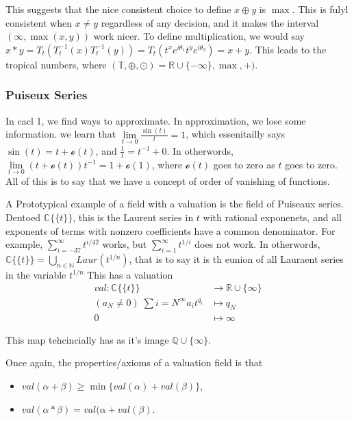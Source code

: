 \documentclass[11pt]{article}
\theoremstyle{definition}
\theoremstyle{plain}%
\theoremstyle{definition}
\def\QQ{{\mathbb Q}}
\def\RR{{\mathbb R}}
\def\CC{{\mathbb C}}
\def\NN{{\mathbb N}}
\begin{document}
This suggests that the nice consistent choice to define $x\oplus y$ is $\max$. This is fulyl consistent when $x \neq y$ regardless of any decision, and it makes the interval $(\infty, \max(x,y))$ work nicer. To define multiplication, we would say $x*y = T_t(T_t^{-1}(x) T_t^{-1}(y))= T_t(t^xe^{i\theta_1}t^ye^{i\theta_2}) = x+y$. This leads to the tropical numbers, where
$(\mathbb{T}, \oplus, \odot) = \RR\cup \{-\infty\}, \max, +)$.







\subsubsection{Puiseux  Series}


In cacl 1, we find ways to approximate. In approximation, we lose some information. we learn that $\lim\limits_{t\rightarrow 0} \frac{\sin(t)}{t} =1$, which essenitailly says $\sin(t) = t+\mathscr{o}(t)$, and $\frac{1}{t} = t^{-1} + 0$. In otherwords, $\lim\limits_{t \rightarrow 0} (t+\mathscr{o}(t))t^{-1} = 1 + \mathscr{o}(1)$, where $ \mathscr{o}(t)$ goes to zero as $t$ goes to zero. All of this is to say that we have a concept of order of vanishing of functions.




A Prototypical example of a field with a valuation is the field of Puiseaux series. Dentoed $\CC\{\{t\}\}$, this is the Laurent series in $t$ with rational exponenets, and all exponents of terms with nonzero coefficients have a common denominator. For example, $\sum\limits_{i=-37}^{\infty} t^{i/42}$ works, but $\sum\limits_{i=1}^\infty t^{1/i}$ does not work. In otherwords, $\CC\{\{t\}\} = \bigcup\limits_{n \in \NN} Laur(t^{1/n})$, that is to say it is th eunion of all Lauraent series in the variable $t^{1/n}$ This has a valuation
\begin{align}
    val: \CC\{\{t\}\} &\rightarrow \RR \cup \{\infty\}
    \\
    (a_N\neq 0)\; \sum\limits{i=N}^\infty a_it^{q_i} &\mapsto q_N
    \\
    0 &\mapsto \infty
\end{align}

This map tehcincially has as it's image $\QQ \cup \{\infty\}$.


Once again, the properties/axioms of a valuation field is that
\begin{itemize}
    \item $val(\alpha + \beta) \geq \min \{val(\alpha) + val(\beta)\}$,
    \item $val(\alpha * \beta) = val(\alpha + val(\beta)$.
\end{itemize}
\end{document}
